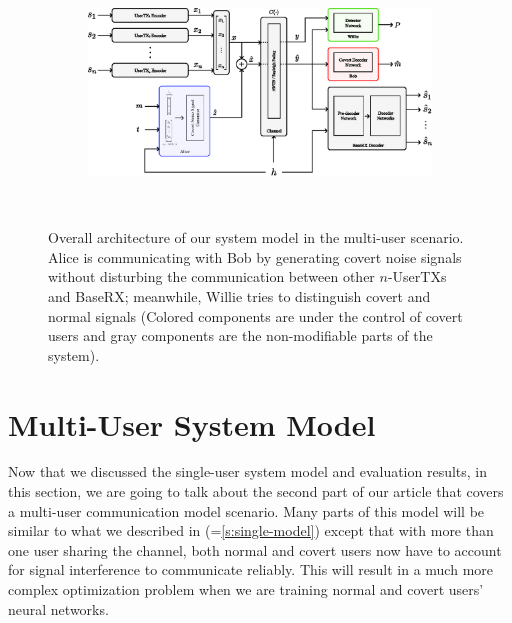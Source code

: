 \begin{figure}[thp]
	\center
	\begin{subfigure}{0.75\textwidth}
		\includegraphics[width=\linewidth]{figs/multi_system_architecture}
	\end{subfigure}
	\\
	\caption{Overall architecture of our system model in the multi-user scenario. Alice is communicating with Bob by generating covert noise signals without disturbing the communication between other \(n\)-UserTXs and BaseRX; meanwhile, Willie tries to distinguish covert and normal signals (Colored components are under the control of covert users and gray components are the non-modifiable parts of the system).}	
	\label{fig:multi_system_architecture}
\end{figure}


\section{Multi-User System Model}
\label{s:multi-model}
Now that we discussed the single-user system model and evaluation results, in this section, we are going to talk about the second part of our article that covers a multi-user communication model scenario. Many parts of this model will be similar to what we described in (=\ref{s:single-model}) except that with more than one user sharing the channel, both normal and covert users now have to account for signal interference to communicate reliably. This will result in a much more complex optimization problem when we are training normal and covert users' neural networks.

